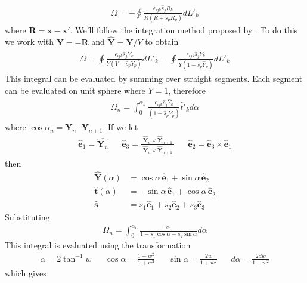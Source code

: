 \begin{align}
\Omega=-\oint\frac{\epsilon_{ijk}\hat{s}_jR_k}{R(R+\hat{s}_pR_p)}dL'_k
\end{align}
where $\bm R=\bm x-\bm x'$. We'll follow the integration method proposed by \cite{Asvestas:wt}. To do this we work with $\bm Y=-\bm R$ and $\hat{\bm Y}=\bm Y/Y$ to obtain  
\begin{align}
\Omega
=\oint\frac{\epsilon_{ijk}\hat{s}_jY_k}{Y(Y-\hat{s}_pY_p)}dL'_k
=\oint\frac{\epsilon_{ijk}\hat{s}_j\hat{Y}_k}{Y(1-\hat{s}_p\hat{Y}_p)}dL'_k
\end{align}
This integral can be evaluated by summing over straight segments. Each segment can be evaluated on unit sphere where $Y=1$, therefore
\begin{align}
\Omega_n=\int_0^{\alpha_n}\frac{\epsilon_{ijk}\hat{s}_j\hat{Y}_k}{(1-\hat{s}_p\hat{Y}_p)}\hat{t}'_kd\alpha
\end{align}
where $\cos\alpha_n=\bm Y_n\cdot \bm Y_{n+1}$.
If we let 
\begin{align}
\hat{\bm e}_1=\hat{\bm Y_n} && \hat{\bm e}_3=\frac{\hat{\bm Y}_n\times\hat{\bm Y}_{n+1}}{| \hat{\bm Y}_n\times\hat{\bm Y}_{n+1}|}  && \hat{\bm e}_2=\hat{\bm e}_3\times \hat{\bm e}_1
\end{align}
then
\begin{align}
\hat{\bm Y}(\alpha)&=\cos\alpha \, \hat{\bm e}_1+\sin \alpha \, \hat{\bm e}_2\\
\hat{\bm t}(\alpha)&=-\sin\alpha \, \hat{\bm e}_1+\cos \alpha \, \hat{\bm e}_2\\
\hat{\bm s}&=s_1 \hat{\bm e}_1+s_2 \hat{\bm e}_2+s_3 \hat{\bm e}_3
\end{align}
Substituting
\begin{align}
\Omega_n=\int_0^{\alpha_n}\frac{s_3}{1-s_1\cos\alpha-s_2\sin\alpha}d\alpha
\end{align}
This integral is evaluated using the transformation 
\begin{align}
\alpha =2\tan^{-1} w && \cos\alpha=\frac{1-w^2}{1+w^2} && \sin\alpha=\frac{2w}{1+w^2} && d\alpha=\frac{2dw}{1+w^2}
\end{align}
which gives
